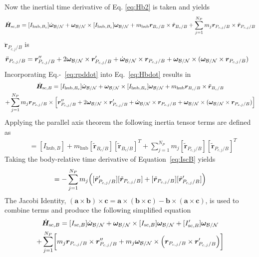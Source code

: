 Now the inertial time derivative of Eq. \eqref{eq:Hb2} is taken and yields
\begin{equation}
	\dot{\bm{H}}_{\text{sc},B} = [I_{\text{hub},B_c}] \dot{\bm\omega}_{\cal B/N} + \bm\omega_{\cal B/N} \times [I_{\text{hub},B_c}] \bm\omega_{\cal B/N} + m_{\text{\text{hub}}}\bm{r}_{B_{c}/B} \times \ddot{\bm{r}}_{B_{c}/B} +  \sum\limits_{j=1}^{N_P}m_j \bm r_{P_{c,j}/B}\times \ddot{\bm r}_{P_{c,j}/B}
	\label{eq:Hbdot}
\end{equation}
$\ddot{\bm r}_{P_{c,j}/B}$ is
\begin{align}
	\ddot{\bm{r}}_{P_{c,j}/B}  &= \bm{r}''_{P_{c,j}/B} +2 \bm\omega_{\cal B/N} \times \bm{r}'_{P_{c,j}/B} + \dot{\bm\omega}_{\cal B/N} \times \bm{r}_{P_{c,j}/B}  +\bm\omega_{\cal B/N} \times (\bm\omega_{\cal B/N} \times \bm{r}_{P_{c,j}/B})
	\label{eq:rpddot}
\end{align}
Incorporating Eq.-~\eqref{eq:rpddot} into Eq.~\eqref{eq:Hbdot} results in
\begin{multline}
	\dot{\bm{H}}_{\text{sc},B} = [I_{\text{hub},B_c}] \dot{\bm\omega}_{\cal B/N} + \bm\omega_{\cal B/N} \times [I_{\text{hub},B_c}] \bm\omega_{\cal B/N} + m_{\text{\text{hub}}}\bm{r}_{B_{c}/B} \times \ddot{\bm{r}}_{B_{c}/B}\\ + \sum\limits_{j=1}^{N_P}m_j \bm r_{P_{c,j}/B}\times \Bigl[\bm{r}''_{P_{c,j}/B} +2 \bm\omega_{\cal B/N} \times \bm{r}'_{P_{c,j}/B} + \dot{\bm\omega}_{\cal B/N} \times \bm{r}_{P_{c,j}/B} +\bm\omega_{\cal B/N} \times (\bm\omega_{\cal B/N} \times \bm{r}_{P_{c,j}/B})\Bigr]
	\label{eq:Hbdot2}
\end{multline}
Applying the parallel axis theorem the following inertia tensor terms are defined as
\begin{align}
	[I_{\text{sc},B}] &= [I_{\text{hub},B}] + m_{\text{hub}} [\tilde{\bm{r}}_{B_{c}/B}] [\tilde{\bm{r}}_{B_{c}/B}]^T + \sum\limits_{j=1}^{N_P} m_j [\tilde{\bm{r}}_{P_{c,j}/B}] [\tilde{\bm{r}}_{P_{c,j}/B}]^T
	\label{eq:IscB}
\end{align}
Taking the body-relative time derivative of Equation~\eqref{eq:IscB} yields
\begin{equation}
	[I'_{\text{sc},B}] =
	- \sum\limits_{j=1}^{N_P} m_j \Bigl(  [\tilde{\bm{r}}'_{P_{c,j}/B}] [\tilde{\bm{r}}_{P_{c,j}/B}] + [\tilde{\bm{r}}_{P_{c,j}/B}] [\tilde{\bm{r}}'_{P_{c,j}/B}]  \Bigr)
\end{equation}
The Jacobi Identity, $(\bm a \times \bm b)\times \bm c = \bm a \times (\bm b\times \bm c) - \bm b \times (\bm a\times \bm c)$, is used to combine terms and produce the following simplified equation
\begin{multline}
	\dot{\bm{H}}_{\text{sc},B} = [I_{\text{sc},B}] \dot{\bm\omega}_{\cal B/N} + \bm\omega_{\cal B/N} \times [I_{\text{sc},B}] \bm\omega_{\cal B/N} + [I'_{\text{sc},B}] \bm\omega_{\cal B/N}
	\\+ \sum\limits_{j=1}^{N_P}\biggl[m_j \bm r_{P_{c,j}/B}\times\bm{r}''_{P_{c,j}/B}
	+ m_j \bm\omega_{\cal B/N} \times \Bigl(\bm{r}_{P_{c,j}/B} \times \bm{r}'_{P_{c,j}/B}\Bigr)\biggr]
	\label{eq:Hbdot4}
\end{multline}

